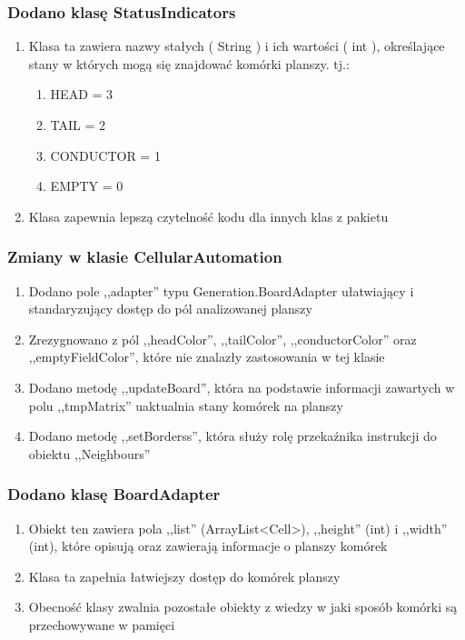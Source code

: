 \documentclass[a4paper,11pt]{article}
\begin{document}
\subsubsection{Dodano klasę StatusIndicators}
\begin{enumerate}
\item Klasa ta zawiera nazwy stałych ( String ) i ich wartości ( int ), określające stany w których mogą się znajdować komórki planszy. tj.:
\begin{enumerate}
\item HEAD = 3
\item TAIL = 2
\item CONDUCTOR = 1
\item EMPTY = 0
\end{enumerate}
\item Klasa zapewnia lepszą czytelność kodu dla innych klas z pakietu
\end{enumerate}
\subsubsection{Zmiany w klasie CellularAutomation}
\begin{enumerate}
\item Dodano pole ,,adapter'' typu Generation.BoardAdapter ułatwiający i standaryzujący dostęp do pól analizowanej planszy
\item Zrezygnowano z pól ,,headColor'', ,,tailColor'', ,,conductorColor'' oraz ,,emptyFieldColor'', które nie znalazły zastosowania w tej klasie
\item Dodano metodę ,,updateBoard'', która na podstawie informacji zawartych w polu ,,tmpMatrix'' uaktualnia stany komórek na planszy
\item Dodano metodę ,,setBorderss'', która służy rolę przekaźnika instrukcji do obiektu ,,Neighbours''
\end{enumerate}
\subsubsection{Dodano klasę BoardAdapter}
\begin{enumerate}
\item Obiekt ten zawiera pola ,,list'' (ArrayList<Cell>), ,,height'' (int) i ,,width'' (int), które opisują oraz zawierają informacje o planszy komórek
\item Klasa ta zapełnia łatwiejszy dostęp do komórek planszy
\item Obecność klasy zwalnia pozostałe obiekty z wiedzy w jaki sposób komórki są przechowywane w pamięci
\end{enumerate}
\end{document}
